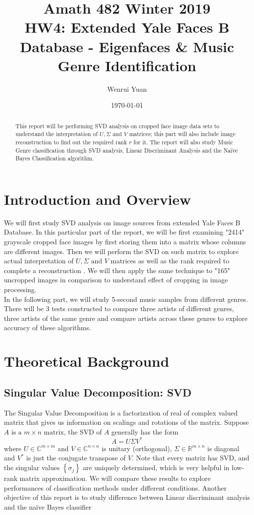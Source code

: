 \documentclass[11pt,a4paper]{article}
\title{Amath 482 Winter 2019 \\
HW4: Extended Yale Faces B Database - Eigenfaces \& Music Genre
Identification}
\author{Wenrui Yuan}
\date{\today}
\numberwithin{equation}{subsection}
\begin{document}
\maketitle

\begin{abstract}
	This report will be performing SVD analysis on cropped face image data sets to understand the interpretation of $U, \Sigma \text{ and } V$ matrices; this part will also include image reconstruction to find out the required rank $r$ for it. The report will also study  Music Genre classification through SVD analysis, Linear Discriminant Analysis and the Na\"ive Bayes Classification algorithm. 
\end{abstract}

\section{Introduction and Overview}
We will first study SVD analysis on image sources from extended Yale Faces B Database. In this particular part of the report, we will be first examining "2414" grayscale cropped face images by first storing them into a matrix whose columns are different images. Then we will perform the SVD on such matrix to explore actual interpretation of $U, \Sigma \text{ and } V$ matrices as well as the rank required to complete a reconstruction . We will then apply the same technique to "165" uncropped images in comparison to understand effect of cropping in image processing.\\
In the following part, we will study 5-second music samples from different genres. There will be 3 tests constructed to compare three artists of different genres, three artists of the same genre and compare artists across these genres to explore accuracy of these algorithms.

\section{Theoretical Background}
\subsection{Singular Value Decomposition: SVD}
The Singular Value Decomposition is a factorization of real of complex valued matrix that gives us information on scalings and rotations of the matrix. Suppose $A \text{ is a } m\times n \text{ matrix}$, the SVD of $A$ generally has the form \cite{svd}
\begin{equation}
A=U\Sigma V^*
\end{equation}
where $U\in \mathbb{C}^{m\times m}$ and $V\in \mathbb{C}^{n\times n}$ is unitary (orthogonal), $\Sigma\in \mathbb{R}^{m\times n}$ is diagonal and $V^*$ is just the conjugate transpose of $V$. Note that every matrix has SVD, and the singular values $\left\{ \sigma_{j}\right\}$ are uniquely determined, which is very helpful in low-rank matrix approximation\cite{582}. We will compare these results to explore performances of classification methods under different conditions. Another objective of this report is to study difference between Linear discriminant analysis and the na\"ive Bayes classifier
\end{document}
